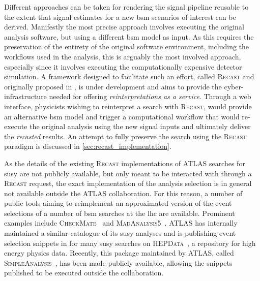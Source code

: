 Different approaches can be taken for rendering the signal pipeline reusable to the extent that signal estimates for a new \gls{bsm} scenarios of interest can be derived. Manifestly the most precise approach involves executing the original analysis software, but using a different \gls{bsm} model as input. As this requires the preservation of the entirety of the original software environment, including the workflows used in the analysis, this is arguably the most involved approach, especially since it involves executing the computationally expensive detector simulation. 
A framework designed to facilitate such an effort, called \textsc{Recast} and originally proposed in \cite{RECAST_cranmer}, is under development and aims to provide the cyber-infrastructure needed for offering \textit{reinterpretations as a service}. 
Through a web interface, physicists wishing to reinterpret a search with \textsc{Recast}, would provide an alternative \gls{bsm} model and trigger a computational workflow that would re-execute the original analysis using the new signal inputs and ultimately deliver the \textit{recasted} results. An attempt to fully preserve the \onelepton search using the \textsc{Recast} paradigm is discussed in \cref{sec:recast_implementation}. 

As the details of the existing \textsc{Recast} implementations of ATLAS searches for \gls{susy} are not publicly available, but only meant to be interacted with through a \textsc{Recast} request, the exact implementation of the analysis selection is in general not available outside the ATLAS collaboration.
For this reason, a number of public tools aiming to reimplement an approximated version of the event selections of a number of \gls{bsm} searches at the \gls{lhc} are available.
Prominent examples include \textsc{CheckMate}~\cite{Checkmate2:2016npn,Checkmate:2013wra} and \textsc{MadAnalysis5}~\cite{MadAnalysis:2012fm}.
ATLAS has internally maintained a similar catalogue of its \gls{susy} analyses and is publishing event selection snippets in \Cpp for many \gls{susy} searches on \textsc{HEPData}~\cite{HEPData:2017ypu}, a repository for high energy physics data.
Recently, this package maintained by ATLAS, called \textsc{SimpleAnalysis}~\cite{simpleanalysis}, has been made publicly available, allowing the \Cpp snippets published to be executed outside the collaboration.

